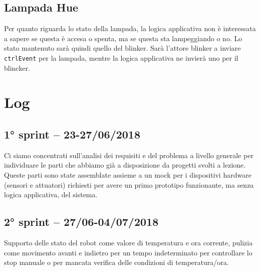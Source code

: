 \subsection{Lampada Hue}
Per quanto riguarda lo stato della lampada, la logica applicativa non è interessata a sapere se questa è accesa o spenta, ma se questa sta lampeggiando o no. Lo stato mantenuto sarà quindi quello del blinker. Sarà l'attore blinker a inviare \texttt{ctrlEvent} per la lampada, mentre la logica applicativa ne invierà uno per il blincker.

\section{Log}

\subsection{1° sprint -- 23-27/06/2018}
Ci siamo concentrati sull'analisi dei requisiti e del problema a livello generale per individuare le parti che abbiamo già a disposizione da progetti svolti a lezione. Queste parti sono state assemblate assieme a un mock per i dispositivi hardware (sensori e attuatori) richiesti per avere un primo prototipo funzionante, ma senza logica applicativa, del sistema.

\subsection{2° sprint -- 27/06-04/07/2018}
Supporto delle stato del robot come valore di temperatura e ora corrente, pulizia come movimento avanti e indietro per un tempo indeterminato per controllare lo stop manuale o per mancata verifica delle condizioni di temperatura/ora.



